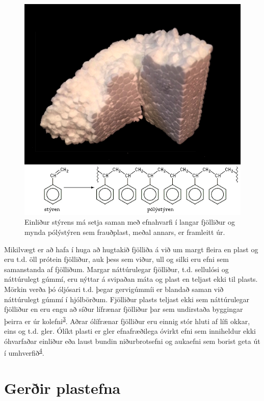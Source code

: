 \documentclass[icelandic,]{book}
\begin{document}
\begin{figure}[H]

{\centering \includegraphics[width=0.7\linewidth]{myndir/polystyrene} 

}

\caption{Einliður stýrens má setja saman með efnahvarfi í langar fjölliður og mynda pólýstýren sem frauðplast, meðal annars, er framleitt úr.}\label{fig:styren}
\end{figure}

Mikilvægt er að hafa í huga að hugtakið fjölliða á við um margt fleira en plast og eru t.d. öll prótein fjölliður, auk þess sem viður, ull og silki eru efni sem samanstanda af fjölliðum. Margar náttúrulegar fjölliður, t.d. sellulósi og náttúrulegt gúmmí, eru nýttar á svipaðan máta og plast en teljast ekki til plasts. Mörkin verða þó óljósari t.d. þegar gervigúmmíi er blandað saman við náttúrulegt gúmmí í hjólbörðum. Fjölliður plasts teljast ekki sem náttúrulegar fjölliður en eru engu að síður lífrænar fjölliður þar sem undirstaða byggingar þeirra er úr kolefni\textsuperscript{\protect\hyperlink{ref-Gowariker2005}{3}}. Aðrar ólífrænar fjölliður eru einnig stór hluti af lífi okkar, eins og t.d. gler. Ólíkt plasti er gler efnafræðilega óvirkt efni sem inniheldur ekki óhvarfaðar einliður eða laust bundin niðurbrotsefni og aukaefni sem borist geta út í umhverfið\textsuperscript{\protect\hyperlink{ref-Gudjonsdottir2015}{4}}.

\hypertarget{gerir-plastefna}{%
\section*{Gerðir plastefna}\label{gerir-plastefna}}
\end{document}
